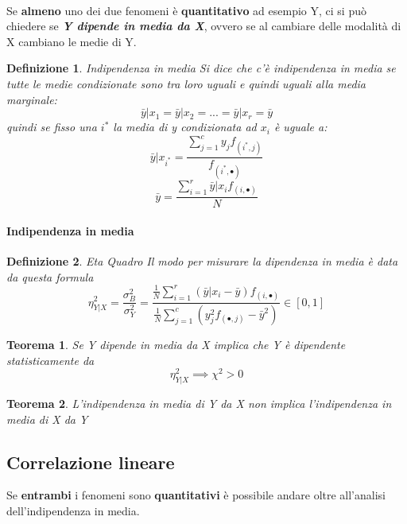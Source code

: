 \documentclass{article}
\newtheorem{definition}{Definizione}[section]
\newtheorem{teorema}{Teorema}[section]
\begin{document}
       \paragraph{}
       
        Se \textbf{almeno} uno dei due fenomeni è \textbf{quantitativo} ad esempio Y, ci si può chiedere se \textbf{\textit{Y dipende in media da X}}, ovvero se al cambiare delle modalità di X cambiano le medie di Y.
         \begin{definition}{Indipendenza in media} Si dice che c'è indipendenza in media se tutte le medie condizionate sono tra loro uguali e quindi uguali alla media marginale:
            $$ \bar{y}|x_1=  \bar{y}|x_2= ... = \bar{y}|x_r= \bar{y}$$
            quindi se fisso una $i^*$ la media di y condizionata ad $x_i$ è uguale a: 
            $$ \bar{y}|x_{i^*}=\frac{\sum_{j=1}^{c}y_jf_{(i^*,j)}}{f_{(i^*,\bullet)}}$$
            $$ \bar{y}= \frac{\sum_{i=1}^{r}\bar{y}|x_if_{(i,\bullet)}}{N}$$
            
        \end{definition}
                    
        
        \paragraph{Indipendenza in media}
        \begin{definition}{Eta Quadro}
        Il modo per misurare la dipendenza in media è data da questa formula
                $$ \eta^2_{Y|X}= \frac {\sigma^2_B}{\sigma^2_Y} =
                \frac{\frac{1}{N}\sum_{i=1}^{r}(\bar{y}|x_i - \bar{y})f_{(i,\bullet)}}
                {\frac{1}{N}\sum_{j=1}^{c}(y_j^2f_{(\bullet,j)} - \bar{y}^2)} \in [0,1] $$
        \end{definition}
        
        \begin{teorema}Se Y dipende in media da X implica che Y è dipendente statisticamente da
            $$
            \eta^2_{Y|X} \implies \chi^2 > 0 $$
        
        \end{teorema}
         \begin{teorema}
          L’indipendenza in media di Y da X non implica l’indipendenza in media di X da Y
        
        \end{teorema}
        
        \subsection{Correlazione lineare}
        Se \textbf{entrambi} i fenomeni sono \textbf{quantitativi} è possibile andare oltre all’analisi dell’indipendenza in media.
        
\end{document}
